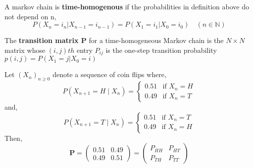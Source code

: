 \documentclass{tufte-handout}
\begin{document}
    \begin{Definition}
        A markov chain is \textbf{time-homogenous} if the probabilities
        in definition above do not depend on n,
        \[ P(X_n = i_n | X_{n-1} = i_{n-1}) = P(X_1 = i_1 | X_0 = i_0) \quad (n\in \mathbb{N})
        \]
    \end{Definition}

    \begin{Definition}
        The \textbf{transition matrix P} for a time-homogeneous 
        Markov chain is the $ N \times N $ matrix whose $ (i,j)th $ entry 
        $ P_{ij} $ is the one-step transition probability $ p(i,j) = P(X_1 = j|X_0 = i) $
    \end{Definition}

    \begin{Example}
        Let $(X_n)_{n \geq 0}$ denote a sequence of coin flips where,
            \[
            P(X_{n+1} = H \mid X_n) =
            \begin{cases}
            0.51 & \text{if } X_n = H \\
            0.49 & \text{if } X_n = T
            \end{cases}
            \]            and,
            \[
            P(X_{n+1} = T \mid X_n) =
            \begin{cases}
            0.51 & \text{if } X_n = T \\
            0.49 & \text{if } X_n = H
            \end{cases}
            \]            Then,            
            \[
            \mathbf{P} = 
            \begin{pmatrix}
            0.51 & 0.49 \\
            0.49 & 0.51
            \end{pmatrix}
            =
            \begin{pmatrix}
            P_{HH} & P_{HT} \\
            P_{TH} & P_{TT}
            \end{pmatrix}
            \]
    \end{Example}
\end{document}
